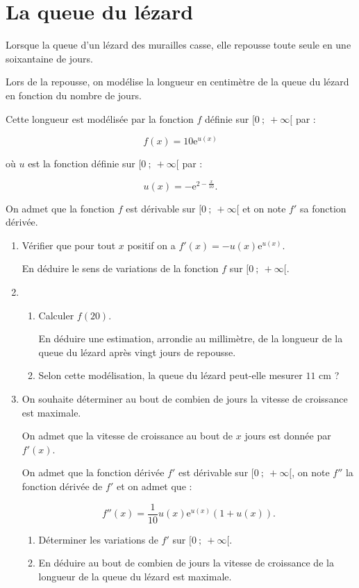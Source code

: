 \documentclass{cornouaille}
\begin{document}
\tableofcontents

\section{La queue du lézard}
\begin{exercice}
Lorsque la queue d'un lézard des murailles casse, elle repousse toute seule en une soixantaine de jours.

Lors de la repousse, on modélise la longueur en centimètre de la queue du lézard en fonction du nombre de jours.

Cette longueur est modélisée par la fonction $f$ définie sur 
$[0~;~+ \infty[$ par :

\[f(x) = 10\text{e}^{u(x)}\]

où $u$ est la fonction définie sur $[0~;~+ \infty[$ par :
 
\[u(x) = - \text{e}^{2 - \frac{x}{10}}.\]

On admet que la fonction $f$ est dérivable sur $[0~;~+ \infty[$ et on note $f'$ sa fonction dérivée.

\medskip

\begin{enumerate}
\item Vérifier que pour tout $x$ positif on a $f'(x) = - u(x)\text{e}^{u(x)}$.

En déduire le sens de variations de la fonction $f$ sur $[0~;~+ \infty[$.
\item  
	\begin{enumerate}
		\item Calculer $f(20)$.
		
En déduire une estimation, arrondie au millimètre, de la longueur de la queue du lézard après vingt jours de repousse.
		\item Selon cette modélisation, la queue du lézard peut-elle mesurer $11$ cm ?
	\end{enumerate}
\item  On souhaite déterminer au bout de combien de jours la vitesse de croissance est maximale.

On admet que la vitesse de croissance au bout de $x$ jours est donnée par $f'(x)$.

On admet que la fonction dérivée $f'$ est dérivable sur $[0~;~+ \infty[$, on note $f''$ la fonction dérivée de $f'$ et on admet que :

\[f''(x) = \dfrac{1}{10}u(x)\text{e}^{u(x)}(1 + u(x)).\]

	\begin{enumerate}
		\item Déterminer les variations de $f'$ sur  $[0~;~+ \infty[$.
		\item En déduire au bout de combien de jours la vitesse de croissance de la longueur de la queue du lézard est maximale.
	\end{enumerate}
\end{enumerate}
\end{exercice}
\end{document}
